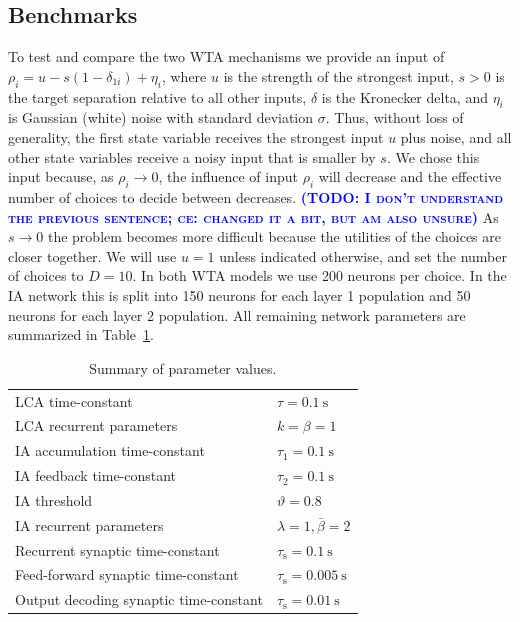 \documentclass[10pt,letterpaper]{article}
\makeatletter
\newcommand{\todo}[1]{\textbf{\textsc{\textcolor{blue}{(TODO\@: #1)}}}}
\makeatother
\begin{document}
\subsection{Benchmarks}
To test and compare the two WTA mechanisms we provide an input of $\rho_i = u - s(1 - \delta_{1i}) + \eta_i$, where $u$ is the strength of the strongest input, 
$s > 0$ is the target separation relative to all other inputs, $\delta$ is the Kronecker delta, and $\eta_i$ is Gaussian (white) noise with standard deviation $\sigma$.
Thus, without loss of generality, the first state variable receives the strongest input $u$ plus noise, and all other state variables receive a noisy input that is smaller by $s$.
We chose this input because, as $\rho_i \rightarrow 0$, the influence of input $\rho_i$ will decrease and the effective number of choices to decide between  decreases.
\todo{I don't understand the previous sentence; ce: changed it a bit, but am also unsure}
As $s \rightarrow 0$ the problem becomes more difficult because the utilities of the choices are closer together.
We will use $u = 1$ unless indicated otherwise, and set the number of choices to $D = 10$.
In both WTA models we use 200 neurons per choice.
In the IA network this is split into 150 neurons for each layer 1 population and 50 neurons for each layer 2 population.
All remaining network parameters are summarized in Table~\ref{tbl:params}.
\begin{table}
    \caption{Summary of parameter values.}\label{tbl:params}
    \begin{tabular}{ll}
        LCA time-constant & $\tau = \SI{0.1}{\second}$ \\
        LCA recurrent parameters & $k = \beta = 1$ \\
        IA accumulation time-constant & $\tau_1 = \SI{0.1}{\second}$ \\
        IA feedback time-constant & $\tau_2 = \SI{0.1}{\second}$ \\
        IA threshold & $\vartheta = 0.8$ \\
        IA recurrent parameters & $\lambda = 1, \bar{\beta} = 2$ \\
        Recurrent synaptic time-constant & $\tau_{\mathrm{s}} 
        = \SI{0.1}{\second}$ \\
        Feed-forward synaptic time-constant & $\tau_{\mathrm{s}} 
        = \SI{0.005}{\second}$ \\
        Output decoding synaptic time-constant & $\tau_{\mathrm{s}} 
        = \SI{0.01}{\second}$
    \end{tabular}
\end{table}
\end{document}
